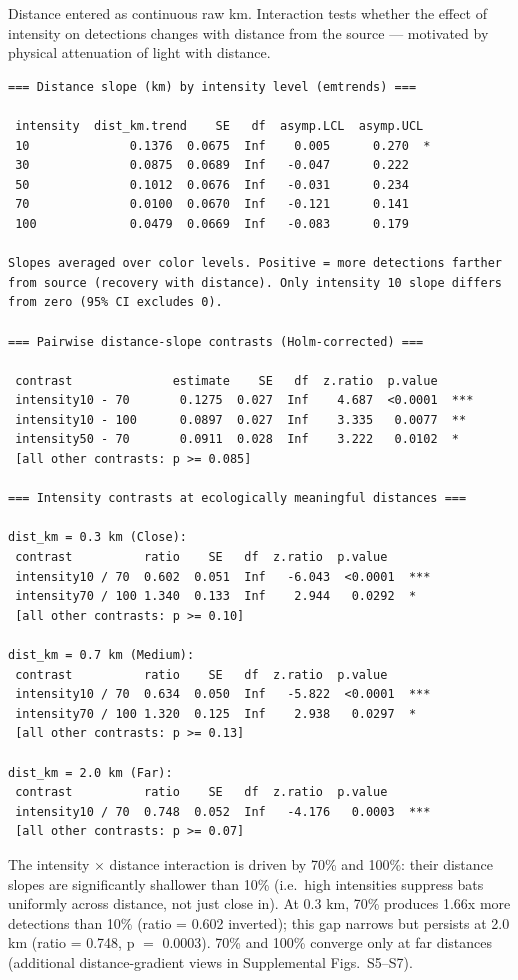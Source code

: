 \documentclass[11pt, letterpaper]{article}
\begin{document}
Distance entered as continuous raw km. Interaction tests whether the
effect of intensity on detections changes with distance from the source
--- motivated by physical attenuation of light with distance.

\begin{verbatim}
=== Distance slope (km) by intensity level (emtrends) ===

 intensity  dist_km.trend    SE   df  asymp.LCL  asymp.UCL
 10              0.1376  0.0675  Inf    0.005      0.270  *
 30              0.0875  0.0689  Inf   -0.047      0.222
 50              0.1012  0.0676  Inf   -0.031      0.234
 70              0.0100  0.0670  Inf   -0.121      0.141
 100             0.0479  0.0669  Inf   -0.083      0.179

Slopes averaged over color levels. Positive = more detections farther
from source (recovery with distance). Only intensity 10 slope differs
from zero (95% CI excludes 0).

=== Pairwise distance-slope contrasts (Holm-corrected) ===

 contrast              estimate    SE   df  z.ratio  p.value
 intensity10 - 70       0.1275  0.027  Inf    4.687  <0.0001  ***
 intensity10 - 100      0.0897  0.027  Inf    3.335   0.0077  **
 intensity50 - 70       0.0911  0.028  Inf    3.222   0.0102  *
 [all other contrasts: p >= 0.085]

=== Intensity contrasts at ecologically meaningful distances ===

dist_km = 0.3 km (Close):
 contrast          ratio    SE   df  z.ratio  p.value
 intensity10 / 70  0.602  0.051  Inf   -6.043  <0.0001  ***
 intensity70 / 100 1.340  0.133  Inf    2.944   0.0292  *
 [all other contrasts: p >= 0.10]

dist_km = 0.7 km (Medium):
 contrast          ratio    SE   df  z.ratio  p.value
 intensity10 / 70  0.634  0.050  Inf   -5.822  <0.0001  ***
 intensity70 / 100 1.320  0.125  Inf    2.938   0.0297  *
 [all other contrasts: p >= 0.13]

dist_km = 2.0 km (Far):
 contrast          ratio    SE   df  z.ratio  p.value
 intensity10 / 70  0.748  0.052  Inf   -4.176   0.0003  ***
 [all other contrasts: p >= 0.07]
\end{verbatim}

The intensity $\times$ distance interaction is driven by 70\% and 100\%:
their distance slopes are significantly shallower than 10\% (i.e.\ high
intensities suppress bats uniformly across distance, not just close in).
At 0.3 km, 70\% produces 1.66x more detections than 10\% (ratio = 0.602
inverted); this gap narrows but persists at 2.0 km (ratio = 0.748,
p $=$ 0.0003). 70\% and 100\% converge only at far distances
(additional distance-gradient views in Supplemental Figs.\ S5--S7).
\end{document}
